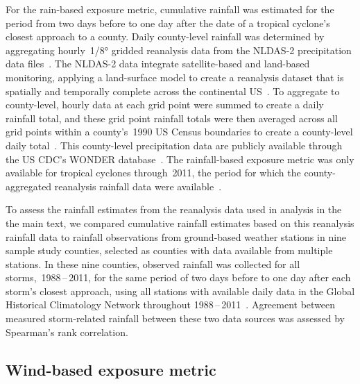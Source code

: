 For the rain-based exposure metric, cumulative rainfall was estimated for the
period from two days before to one day after the date of a tropical cyclone's
closest approach to a county. Daily county-level rainfall was determined by
aggregating hourly~1/8\si{\degree} gridded reanalysis data from the \ac{NLDAS-2}
precipitation data files~\citep{rui2013nldas}. The \ac{NLDAS-2} data integrate
satellite-based and land-based monitoring, applying a land-surface model to
create a reanalysis dataset that is spatially and temporally complete across
the continental \ac{US}~\citep{rui2013nldas, alhamdan2014environmental}. To
aggregate to county-level, hourly data at each grid point were summed to create
a daily rainfall total, and these grid point rainfall totals were then averaged
across all grid points within a county's~1990 \ac{US} Census boundaries to
create a county-level daily total~\citep{alhamdan2014environmental, cdcwonder}.
This county-level precipitation data are publicly available through the \ac{US}
\ac{CDC}'s \ac{WONDER} database~\citep{cdcwonder, alhamdan2014environmental}.
The rainfall-based exposure metric was only available for tropical cyclones
through~2011, the period for which the county-aggregated reanalysis rainfall
data were available~\citep{cdcwonder, alhamdan2014environmental}. 

To assess the rainfall estimates from the reanalysis data used in analysis in
the the main text, we compared cumulative rainfall estimates based on this
reanalysis rainfall data to rainfall observations from ground-based weather
stations in nine sample study counties, selected as counties with data
available from multiple stations. In these nine counties, observed rainfall was
collected for all storms,~1988\,--\,2011, for the same period of two days
before to one day after each storm's closest approach, using all stations with
available daily data in the Global Historical Climatology Network throughout
1988\,--\,2011~\citep{menne2012overview, rnoaa, countyweather}. Agreement
between measured storm-related rainfall between these two data sources was
assessed by Spearman's rank correlation. 

\subsection*{Wind-based exposure metric}

